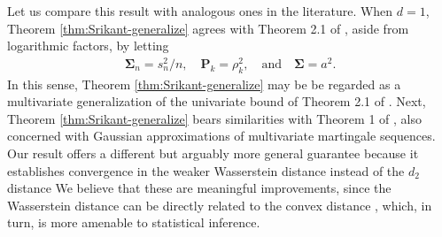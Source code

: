 Let us compare this result with analogous ones in the literature. When $d=1$, Theorem \ref{thm:Srikant-generalize} agrees with Theorem 2.1 of \cite{rollin2018}, aside from logarithmic  factors, by letting
\begin{align*}
	\bm{\Sigma}_n = s_n^2/n, \quad \bm{P}_k = \rho_k^2, \quad \text{and} \quad \bm{\Sigma} = a^2.
\end{align*}
In this sense,  Theorem \ref{thm:Srikant-generalize} may be be regarded as a multivariate generalization of the univariate bound of Theorem 2.1 of \cite{rollin2018}.
Next, Theorem \ref{thm:Srikant-generalize} bears similarities with Theorem 1 of \cite{JMLR2019CLT}, also concerned with Gaussian approximations of multivariate martingale sequences. Our result offers a different but arguably more general guarantee because it establishes convergence in the weaker Wasserstein distance instead of the $d_2$ distance %
We believe that these are meaningful improvements, since the Wasserstein distance can be directly related to the convex distance \citep{nourdin2021multivariate}, which, in turn,  is more amenable to statistical inference. %

